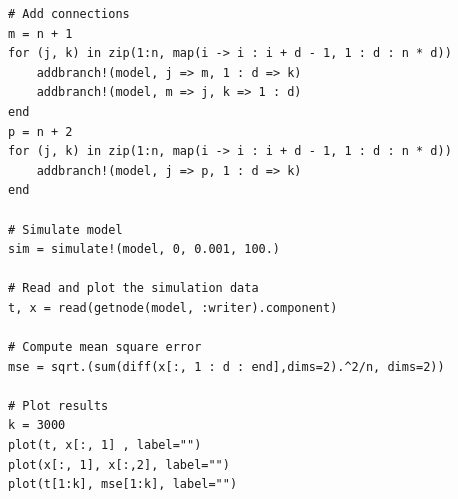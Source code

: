 \documentclass{juliacon}
\begin{document}
\begin{lstlisting}
# Add connections
m = n + 1
for (j, k) in zip(1:n, map(i -> i : i + d - 1, 1 : d : n * d))
    addbranch!(model, j => m, 1 : d => k)
    addbranch!(model, m => j, k => 1 : d)
end
p = n + 2
for (j, k) in zip(1:n, map(i -> i : i + d - 1, 1 : d : n * d))
    addbranch!(model, j => p, 1 : d => k)
end

# Simulate model 
sim = simulate!(model, 0, 0.001, 100.)

# Read and plot the simulation data 
t, x = read(getnode(model, :writer).component)

# Compute mean square error
mse = sqrt.(sum(diff(x[:, 1 : d : end],dims=2).^2/n, dims=2))

# Plot results
k = 3000 
plot(t, x[:, 1] , label="")
plot(x[:, 1], x[:,2], label="")
plot(t[1:k], mse[1:k], label="")
\end{lstlisting}
\end{document}
